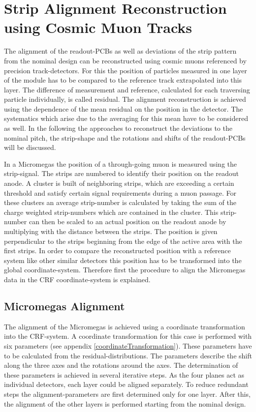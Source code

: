 \documentclass[
twoside,            %
BCOR1.4cm,          %
10pt,               %
headings=normal,    %
headsepline,        %
clearplainpage,		%
final,              %
div=14,
open=right,
bibliography=toc
]{scrreprt}
\begin{document}
\section{Strip Alignment Reconstruction using Cosmic Muon Tracks}
\label{alignmentUsingCosmics}

The alignment of the readout-PCBs as well as deviations of the strip pattern from the nominal design can be reconstructed using cosmic muons referenced by precision track-detectors.
For this the position of particles measured in one layer of the module has to be compared to the reference track extrapolated into this layer.
The difference of measurement and reference, calculated for each traversing particle individually, is called residual.
The alignment reconstruction is achieved using the dependence of the mean residual on the position in the detector.
The systematics which arise due to the averaging for this mean have to be considered as well.
In the following the approaches to reconstruct the deviations to the nominal pitch, the strip-shape and the rotations and shifts of the readout-PCBs will be discussed.

In a Micromegas the position of a through-going muon is measured using the strip-signal.
The strips are numbered to identify their position on the readout anode.
A cluster is built of neighboring strips, which are exceeding a certain threshold and satisfy certain signal requirements during a muon passage.
For these clusters an average strip-number is calculated by taking the sum of the charge weighted strip-numbers which are contained in the cluster.
This strip-number can then be scaled to an actual position on the readout anode by multiplying with the distance between the strips.
The position is given perpendicular to the strips beginning from the edge of the active area with the first strips.
In order to compare the reconstructed position with a reference system like other similar detectors this position has to be transformed into the global coordinate-system.
Therefore first the procedure to align the Micromegas data in the CRF coordinate-system is explained.

\subsection{Micromegas Alignment}\label{dataAlignment}

The alignment of the Micromegas is achieved using a coordinate transformation into the CRF-system.
A coordinate transformation for this case is performed with six parameters (see appendix \ref{coordinateTransformation}).
These parameters have to be calculated from the residual-distributions.
The parameters describe the shift along the three axes and the rotations around the axes.
The determination of these parameters is achieved in several iterative steps.
As the four planes act as individual detectors, each layer could be aligned separately.
To reduce redundant steps the alignment-parameters are first determined only for one layer.
After this, the alignment of the other layers is performed starting from the nominal design.
\end{document}
